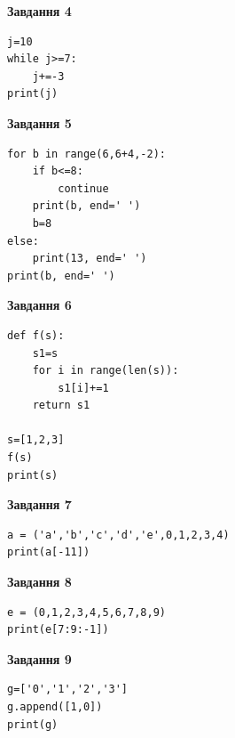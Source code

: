 \documentclass[12pt, ukrainian]{article}
\begin{document}
{{{{{{{{{{{{{{\begin{minipage}[t]{7.5cm}
\begin{center}
\textbf{Завдання 4}
\end{center}

\begin{verbatim}
j=10
while j>=7:
    j+=-3
print(j)
\end{verbatim}

\end{minipage}
\vline \hspace{6mm}
\begin{minipage}[t]{10.5cm}

\begin{center}
\textbf{Завдання 5}
\end{center}

\begin{verbatim}
for b in range(6,6+4,-2):
    if b<=8:
        continue
    print(b, end=' ')
    b=8
else:
    print(13, end=' ')
print(b, end=' ')
\end{verbatim}



\begin{center}
\textbf{Завдання 6}
\end{center}

\begin{verbatim}
def f(s):
    s1=s
    for i in range(len(s)):
        s1[i]+=1
    return s1

s=[1,2,3]
f(s)
print(s)
\end{verbatim}



\begin{center}
\textbf{Завдання 7}
\end{center}

\begin{verbatim}
a = ('a','b','c','d','e',0,1,2,3,4)
print(a[-11])
\end{verbatim}



\begin{center}
\textbf{Завдання 8}
\end{center}

\begin{verbatim}
e = (0,1,2,3,4,5,6,7,8,9)
print(e[7:9:-1])
\end{verbatim}



\begin{center}
\textbf{Завдання 9}
\end{center}

\begin{verbatim}
g=['0','1','2','3']
g.append([1,0])
print(g)
\end{verbatim}




\end{minipage}}}}}}}}}}}}}}}
\end{document}
